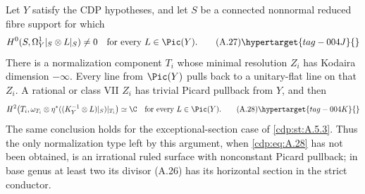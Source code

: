 \begin{proposition}\hypertarget{tag-01BE}{}\label{cdp:st:A.5.4}


Let $Y$ satisfy the CDP hypotheses, and let $S$ be a connected nonnormal reduced fibre support for which
\[
 H^0(S,\Omega_Y^1|_S\otimes L|_S)\ne0
 \quad\hbox{for every }L\in\Pic(Y).
 \tag{A.27}\hypertarget{tag-004J}{}\label{cdp:eq:A.27}
\]
There is a normalization component $T_i$ whose minimal resolution $Z_i$ has Kodaira dimension $-\infty$. Every line from $\Pic(Y)$ pulls back to a unitary-flat line on that $Z_i$. A rational or class VII $Z_i$ has trivial Picard pullback from $Y$, and then
\[
 H^2\!\left(T_i,\omega_{T_i}\otimes
             \eta^*((K_Y^{-1}\otimes L)|_S)|_{T_i}\right)\simeq\C
 \quad\hbox{for every }L\in\Pic(Y).
 \tag{A.28}\hypertarget{tag-004K}{}\label{cdp:eq:A.28}
\]
The same conclusion holds for the exceptional-section case of \ref{cdp:st:A.5.3}. Thus the only normalization type left by this argument, when \eqref{cdp:eq:A.28} has not been obtained, is an irrational ruled surface with nonconstant Picard pullback; in base genus at least two its divisor (A.26) has its horizontal section in the strict conductor.
\end{proposition}

